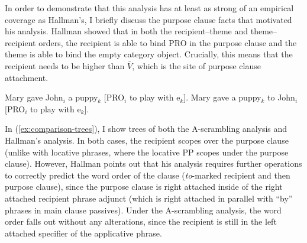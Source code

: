 In order to demonstrate that this analysis has at least as strong of an empirical coverage as Hallman's, I briefly discuss the purpose clause facts that motivated his analysis. Hallman showed that in both the recipient--theme and theme--recipient orders, the recipient is able to bind PRO in the purpose clause and the theme is able to bind the empty category object. Crucially, this means that the recipient needs to be higher than $\bar{V}$, which is the site of purpose clause attachment.
\begin{exe}
\ex \cite[exx 6 \& 7]{Hallman.2015}
\begin{xlist}
\ex Mary gave John$_{i}$ a puppy$_{k}$ [PRO$_{i}$ to play with e$_{k}$].
\ex Mary gave a puppy$_{k}$ to John$_{i}$ [PRO$_{i}$ to play with e$_{k}$].
\end{xlist}
\end{exe}%
In (\ref{ex:comparison-trees}), I show trees of both the A-scrambling analysis and Hallman's analysis. In both cases, the recipient scopes over the purpose clause (unlike with locative phrases, where the locative PP scopes under the purpose clause). However, Hallman points out that his analysis requires further operations to correctly predict the word order of the clause (\textit{to}-marked recipient and then purpose clause), since the purpose clause is right attached inside of the right attached recipient phrase adjunct (which is right attached in parallel with ``by'' phrases in main clause passives). Under the A-scrambling analysis, the word order falls out without any alterations, since the recipient is still in the left attached specifier of the applicative phrase.

